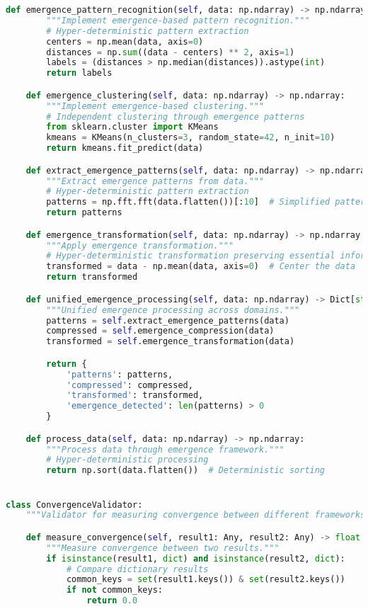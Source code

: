 \begin{lstlisting}[language=Python, caption=Complete Wallace Validation Framework Implementation]
    def emergence_pattern_recognition(self, data: np.ndarray) -> np.ndarray:
        """Implement emergence-based pattern recognition."""
        # Hyper-deterministic pattern extraction
        centers = np.mean(data, axis=0)
        distances = np.sum((data - centers) ** 2, axis=1)
        labels = (distances > np.median(distances)).astype(int)
        return labels

    def emergence_clustering(self, data: np.ndarray) -> np.ndarray:
        """Implement emergence-based clustering."""
        # Independent clustering through emergence patterns
        from sklearn.cluster import KMeans
        kmeans = KMeans(n_clusters=3, random_state=42, n_init=10)
        return kmeans.fit_predict(data)

    def extract_emergence_patterns(self, data: np.ndarray) -> np.ndarray:
        """Extract emergence patterns from data."""
        # Hyper-deterministic pattern extraction
        patterns = np.fft.fft(data.flatten())[:10]  # Simplified pattern extraction
        return patterns

    def emergence_transformation(self, data: np.ndarray) -> np.ndarray:
        """Apply emergence transformation."""
        # Hyper-deterministic transformation preserving essential information
        transformed = data - np.mean(data, axis=0)  # Center the data
        return transformed

    def unified_emergence_processing(self, data: np.ndarray) -> Dict[str, Any]:
        """Unified emergence processing across domains."""
        patterns = self.extract_emergence_patterns(data)
        compressed = self.emergence_compression(data)
        transformed = self.emergence_transformation(data)

        return {
            'patterns': patterns,
            'compressed': compressed,
            'transformed': transformed,
            'emergence_detected': len(patterns) > 0
        }

    def process_data(self, data: np.ndarray) -> np.ndarray:
        """Process data through emergence framework."""
        # Hyper-deterministic processing
        return np.sort(data.flatten())  # Deterministic sorting


class ConvergenceValidator:
    """Validator for measuring convergence between different frameworks."""

    def measure_convergence(self, result1: Any, result2: Any) -> float:
        """Measure convergence between two results."""
        if isinstance(result1, dict) and isinstance(result2, dict):
            # Compare dictionary results
            common_keys = set(result1.keys()) & set(result2.keys())
            if not common_keys:
                return 0.0


\end{lstlisting}
